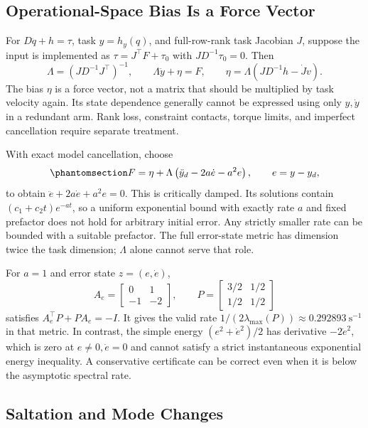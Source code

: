 \documentclass[
  10pt,
  letterpaper,
  DIV=11,
  numbers=noendperiod]{scrartcl}
\begin{document}
\subsection{Operational-Space Bias Is a Force
Vector}\label{operational-space-bias-is-a-force-vector}

For \(D\ddot q+h=\tau\), task \(y=h_y(q)\), and full-row-rank task
Jacobian \(J\), suppose the input is implemented as
\(\tau=J^\top F+\tau_0\) with \(JD^{-1}\tau_0=0\). Then \[
\Lambda=(JD^{-1}J^\top)^{-1},\qquad
\Lambda\ddot y+\eta=F,\qquad
\eta=\Lambda(JD^{-1}h-\dot Jv).
\] The bias \(\eta\) is a force vector, not a matrix that should be
multiplied by task velocity again. Its state dependence generally cannot
be expressed using only \(y,\dot y\) in a redundant arm. Rank loss,
constraint contacts, torque limits, and imperfect cancellation require
separate treatment.

With exact model cancellation, choose
\begin{equation}\phantomsection\label{eq-task-force}{
F=\eta+\Lambda\left(\ddot y_d-2a\dot e-a^2e\right),\qquad e=y-y_d,
}\end{equation} to obtain \(\ddot e+2a\dot e+a^2e=0\). This is
critically damped. Its solutions contain \((c_1+c_2t)e^{-at}\), so a
uniform exponential bound with exactly rate \(a\) and fixed prefactor
does not hold for arbitrary initial error. Any strictly smaller rate can
be bounded with a suitable prefactor. The full error-state metric has
dimension twice the task dimension; \(\Lambda\) alone cannot serve that
role.

For \(a=1\) and error state \(z=(e,\dot e)\), \[
A_e=\begin{bmatrix}0&1\\-1&-2\end{bmatrix},\qquad
P=\begin{bmatrix}3/2&1/2\\1/2&1/2\end{bmatrix}
\] satisfies \(A_e^\top P+PA_e=-I\). It gives the valid rate
\(1/(2\lambda_{\max}(P))\approx0.292893\ \mathrm{s}^{-1}\) in that
metric. In contrast, the simple energy \((e^2+\dot e^2)/2\) has
derivative \(-2\dot e^2\), which is zero at \(e\ne0,\dot e=0\) and
cannot satisfy a strict instantaneous exponential energy inequality. A
conservative certificate can be correct even when it is below the
asymptotic spectral rate.

\subsection{Saltation and Mode
Changes}\label{saltation-and-mode-changes}
\end{document}
